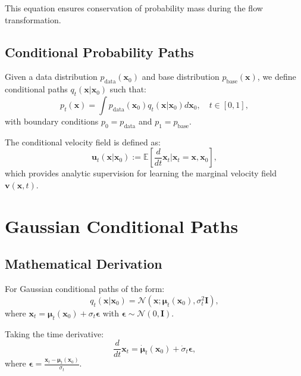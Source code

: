 This equation ensures conservation of probability mass during the flow transformation.

\subsection{Conditional Probability Paths}

Given a data distribution $p_{\text{data}}(\mathbf{x}_0)$ and base distribution $p_{\text{base}}(\mathbf{x})$, we define conditional paths $q_t(\mathbf{x}|\mathbf{x}_0)$ such that:
\begin{equation}
    p_t(\mathbf{x}) = \int p_{\text{data}}(\mathbf{x}_0) q_t(\mathbf{x}|\mathbf{x}_0) d\mathbf{x}_0, \quad t \in [0,1],
\end{equation}
with boundary conditions $p_0 = p_{\text{data}}$ and $p_1 = p_{\text{base}}$.

The conditional velocity field is defined as:
\begin{equation}
    \mathbf{u}_t(\mathbf{x}|\mathbf{x}_0) := \mathbb{E}\left[\frac{d}{dt} \mathbf{x}_t \bigg| \mathbf{x}_t = \mathbf{x}, \mathbf{x}_0\right],
\end{equation}
which provides analytic supervision for learning the marginal velocity field $\mathbf{v}(\mathbf{x},t)$.

\section{Gaussian Conditional Paths}

\subsection{Mathematical Derivation}

For Gaussian conditional paths of the form:
\begin{equation}
    q_t(\mathbf{x}|\mathbf{x}_0) = \mathcal{N}(\mathbf{x}; \boldsymbol{\mu}_t(\mathbf{x}_0), \sigma_t^2\mathbf{I}),
\end{equation}
where $\mathbf{x}_t = \boldsymbol{\mu}_t(\mathbf{x}_0) + \sigma_t \boldsymbol{\epsilon}$ with $\boldsymbol{\epsilon} \sim \mathcal{N}(0,\mathbf{I})$.

Taking the time derivative:
\begin{equation}
    \frac{d}{dt} \mathbf{x}_t = \dot{\boldsymbol{\mu}}_t(\mathbf{x}_0) + \dot{\sigma}_t \boldsymbol{\epsilon},
\end{equation}
where $\boldsymbol{\epsilon} = \frac{\mathbf{x}_t - \boldsymbol{\mu}_t(\mathbf{x}_0)}{\sigma_t}$.

